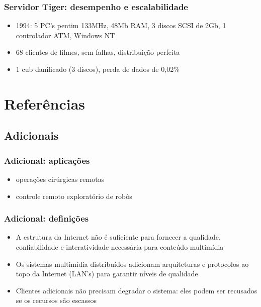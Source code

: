 \documentclass[]{beamer}
\begin{document}
\begin{frame}
 \frametitle{Servidor Tiger: desempenho e escalabilidade}
 \begin{itemize}
  \item 1994: 5 PC's pentim 133MHz, 48Mb RAM, 3 discos SCSI de 2Gb, 1 controlador ATM,
Windows NT
  \item 68 clientes de filmes, sem falhas, distribuição perfeita
  \item 1 cub danificado (3 discos), perda de dados de 0,02\%
 \end{itemize}
\end{frame}

\section{Referências}

\subsection{Adicionais}

\begin{frame}
 \frametitle{Adicional: aplicações\cite{Maxlow:2003}}
  \begin{itemize}
   \item operações cirúrgicas remotas
   \item controle remoto exploratório de robôs
  \end{itemize}
\end{frame}

\begin{frame}
 \frametitle{Adicional: definições\cite{Maxlow:2003}}
  \begin{itemize}
   \item A estrutura da Internet não é suficiente para fornecer a qualidade, confiabilidade
e interatividade necessária para conteúdo multimídia
   \item Os sistemas multimídia distribuídos adicionam arquiteturas e protocolos
ao topo da Internet (LAN's) para garantir níveis de qualidade
   \item Clientes adicionais não precisam degradar o sistema: eles podem ser recusados se
os recursos são escassos
  \end{itemize}
\end{frame}

\end{document}
